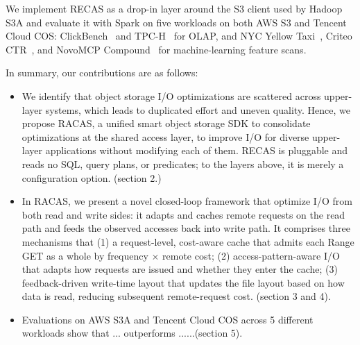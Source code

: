 We implement RECAS as a drop-in layer around the S3 client used by Hadoop S3A and evaluate it with Spark on five workloads on both AWS S3 and Tencent Cloud COS: ClickBench~\cite{} and TPC-H~\cite{} for OLAP, and NYC Yellow Taxi~\cite{}, Criteo CTR~\cite{}, and
NovoMCP Compound~\cite{} for machine-learning feature scans. %

In summary, our contributions are as follows:

\begin{itemize}
    \item We identify that object storage I/O optimizations are scattered across upper-layer systems, which leads to duplicated effort and uneven quality. Hence, we propose RACAS, a unified smart object storage SDK to consolidate optimizations at the shared access layer, to improve I/O for diverse upper-layer applications without modifying each of them. RECAS is pluggable and reads no SQL, query plans, or predicates; to the layers above, it is merely a configuration option. (section 2.)
    
    \item In RACAS, we present a novel closed-loop framework that optimize I/O from both read and write sides: it adapts and caches remote requests on the read path and feeds the observed accesses back into write path. It comprises three mechanisms that (1) a request-level, cost-aware cache that admits each Range GET as a whole by frequency $\times$ remote cost;
    (2) access-pattern-aware I/O that adapts how requests are issued and whether they enter the cache; (3) feedback-driven write-time layout that updates
    the file layout based on how data is read, reducing subsequent remote-request
    cost. (section 3 and 4).
    
    \item Evaluations on AWS S3A and Tencent Cloud COS across 5 different workloads show that ... outperforms ......(section 5).
\end{itemize}

